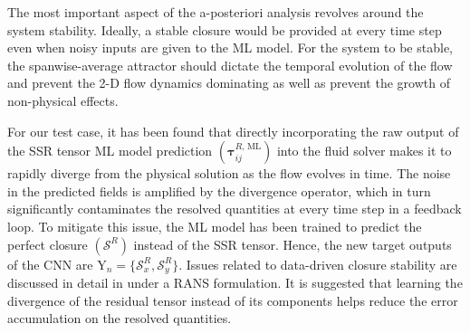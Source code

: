 \documentclass[../main.tex]{subfiles}
\begin{document}
The most important aspect of the a-posteriori analysis revolves around the system stability.
Ideally, a stable closure would be provided at every time step even when noisy inputs are given to the ML model.
For the system to be stable, the spanwise-average attractor should dictate the temporal evolution of the flow and prevent the 2-D flow dynamics dominating as well as prevent the growth of non-physical effects.

For our test case, it has been found that directly incorporating the raw output of the SSR tensor ML model prediction $(\boldsymbol\tau_{ij}^{R,\,\mathrm{ML}})$ into the fluid solver makes it to rapidly diverge from the physical solution as the flow evolves in time.
The noise in the predicted fields is amplified by the divergence operator, which in turn significantly contaminates the resolved quantities at every time step in a feedback loop.
To mitigate this issue, the ML model has been trained to predict the perfect closure $(\mathcal{S}^{R})$ instead of the SSR tensor.
Hence, the new target outputs of the CNN are $\mathrm{Y}_n=\lbrace \mathcal{S}^R_x,\mathcal{S}^R_y\rbrace$.
Issues related to data-driven closure stability are discussed in detail in \cite{Cruz2019} under a RANS formulation.
It is suggested that learning the divergence of the residual tensor instead of its components helps reduce the error accumulation on the resolved quantities.
\end{document}
